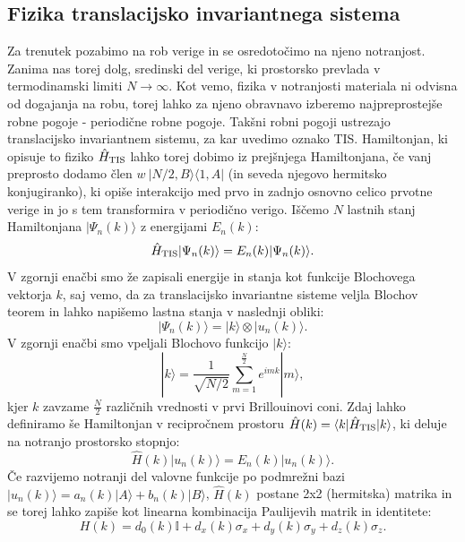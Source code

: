 \subsection{Fizika translacijsko invariantnega sistema}
Za trenutek pozabimo na rob verige in se osredotočimo na njeno notranjost. Zanima nas torej dolg, sredinski del verige, ki prostorsko prevlada v termodinamski limiti $N \to \infty$. Kot vemo, \cite{ashcroft} fizika v notranjosti materiala ni odvisna od dogajanja na robu, torej lahko za njeno obravnavo izberemo najpreprostejše robne pogoje - periodične robne pogoje. Takšni robni pogoji ustrezajo translacijsko invariantnem sistemu, za kar uvedimo oznako TIS. Hamiltonjan, ki opisuje to fiziko $\hat{H}_{\textup{TIS}}$ lahko torej dobimo iz prejšnjega Hamiltonjana, če vanj preprosto dodamo člen $w\ | N/2, B \rangle \langle 1, A|$  (in seveda njegovo hermitsko konjugiranko), ki opiše interakcijo med prvo in zadnjo osnovno celico prvotne verige in jo s tem transformira v periodično verigo.
Iščemo $N$ lastnih stanj Hamiltonjana $|\Psi_n (k) \rangle$ z energijami $E_n(k)$:
\begin{equation}
\hat{H}_{\textup{TIS}} | \Psi_n (k) \rangle = E_n(k) | \Psi_n(k) \rangle.
\end{equation} 
V zgornji enačbi smo že zapisali energije in stanja kot funkcije Blochovega vektorja $k$, saj vemo, da za translacijsko invariantne sisteme veljla Blochov teorem \cite{ashcroft} in lahko napišemo lastna stanja v naslednji obliki:
\begin{equation}
| \Psi_n (k) \rangle = | k \rangle \otimes | u_n (k) \rangle.
\end{equation}
V zgornji enačbi smo vpeljali Blochovo funkcijo $|k\rangle$:
\begin{equation}
|k \rangle = \frac{1}{\sqrt{N/2}} \sum_{m=1}^{\frac{N}{2}} e^{imk} |m \rangle,
\end{equation}
kjer $k$ zavzame $\frac{N}{2}$ različnih vrednosti v prvi Brillouinovi coni.
Zdaj lahko definiramo še Hamiltonjan v recipročnem prostoru $\hat{H}(k) = \langle k | \hat{H}_{\textup{TIS}} | k \rangle$, ki deluje na notranjo prostorsko stopnjo:
\begin{equation}
\hat{H}(k) | u_n(k) \rangle = E_n(k) | u_n(k) \rangle.
\end{equation}
Če razvijemo notranji del valovne funkcije po podmrežni bazi $|u_n(k) \rangle = a_n(k) |A \rangle + b_n(k) | B \rangle$,
$\hat{H}(k)$ postane 2x2 (hermitska) matrika in se torej lahko zapiše kot linearna kombinacija Paulijevih matrik in identitete:
\begin{equation}
H(k) = d_0 (k) \mathbb{I}+ d_x(k) \sigma_x + d_y (k) \sigma_y + d_z(k) \sigma_z.
\end{equation}
